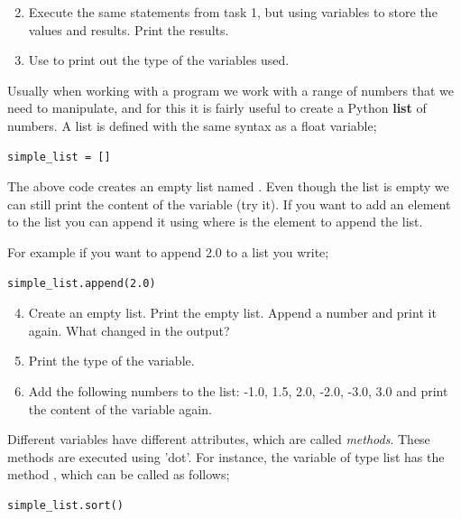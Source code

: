 \documentclass{article}
\begin{document}
\begin{enumerate}
  \setcounter{enumi}{1}
  \item Execute the same statements from task 1, but using variables to store
    the values and results. Print the results.
  \item Use  to print out the type of the variables used.
\end{enumerate}

Usually when working with a program we work with a range of numbers
that we need to manipulate, and for this it is fairly useful to create a Python {\bf list}
of numbers.
A list is defined with the same syntax as a float variable;

\begin{lstlisting}
simple_list = []
\end{lstlisting}

The above code creates an empty list named .
Even though the list is empty we can still print
the content of the variable (try it).
If you want to add an element to the list you can
append it using  where  is the element to append the list.

For example if you want to append 2.0 to a list you write;

\begin{lstlisting}
simple_list.append(2.0)
\end{lstlisting}

\begin{enumerate}
  \setcounter{enumi}{3}
  \item Create an empty list.
    Print the empty list.
    Append a number and print it again.
    What changed in the output?

  \item Print the type of the variable.

  \item Add the following numbers to the list: -1.0, 1.5, 2.0, -2.0, -3.0, 3.0 and
    print the content of the variable again.
\end{enumerate}


Different variables have different attributes, which are called {\em methods}.
These methods are executed using 'dot'.
For instance,
the variable of type list has the method ,
which can be called as follows;

\begin{lstlisting}
simple_list.sort()
\end{lstlisting}
\end{document}
